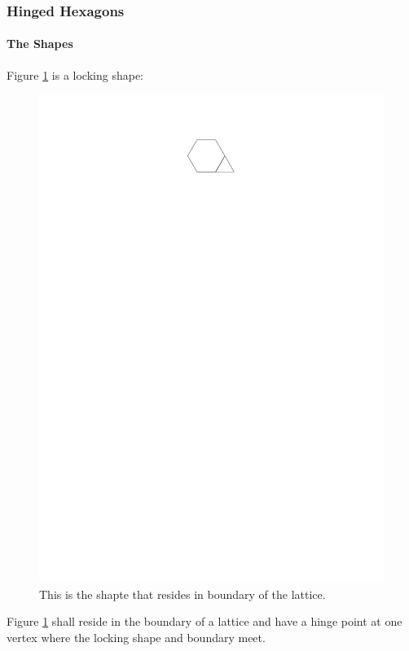 \subsubsection{Hinged Hexagons}
\paragraph{The Shapes}
Figure \ref{fig:lockingShape} is a locking shape:
\begin{figure}[h]
\begin{center}
\includegraphics{graphics/lockingShape.pdf}
\caption{This is the shapte that resides in boundary of the lattice.}
\label{fig:lockingShape}
\end{center}
\end{figure}
Figure \ref{fig:lockingShape} shall reside in the boundary of a lattice and have
a hinge point at one vertex where the locking shape and boundary meet.
